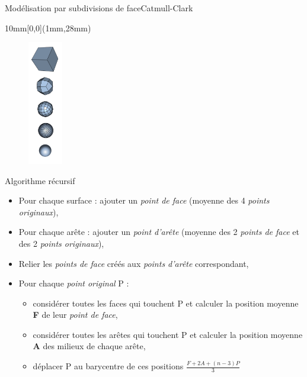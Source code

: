 \documentclass{beamer}
\begin{document}
\begin{frame}[c]{Modélisation par subdivisions de face}{Catmull-Clark}




\begin{minipage}[b]{0.1\linewidth}

\begin{textblock*}{10mm}[0,0](1mm,28mm)
    \begin{figure}
    \includegraphics[width=15mm]{subdivisionSurface/catmull.png}

    \end{figure}
  \end{textblock*}
  
 \end{minipage} \hfill %
 \begin{minipage}[b]{0.88\linewidth}
\begin{block}{Algorithme récursif}
\small
\begin{itemize}

    \item<1->{Pour chaque surface :} ajouter un \textit{point de face}              \newline (moyenne des 4 \textit{points originaux}),
    \item<2->{Pour chaque arête :} ajouter un \textit{point d'arête}                \newline (moyenne des 2 \textit{points de face} et des 2 \textit{points originaux}),
    \item <3->Relier les \textit{points de face} créés aux \textit{points d'arête} correspondant,
    \item<4->{Pour chaque \textit{point original} P :} 
        \begin{itemize}
        \item<5-> considérer toutes les faces qui touchent P 
            \newline et calculer la position moyenne \textbf{F} de leur \textit{point de face},
        \item <6->considérer toutes les arêtes qui touchent P 
            \newline et calculer la position moyenne \textbf{A} des milieux de chaque arête,
        \item<7-> déplacer P au barycentre de ces positions 
        $\frac{F +2A + (n-3)P}{3}$
        \end{itemize}
    

\end{itemize}
\end{block}
\end{minipage}
\end{frame}
\end{document}
